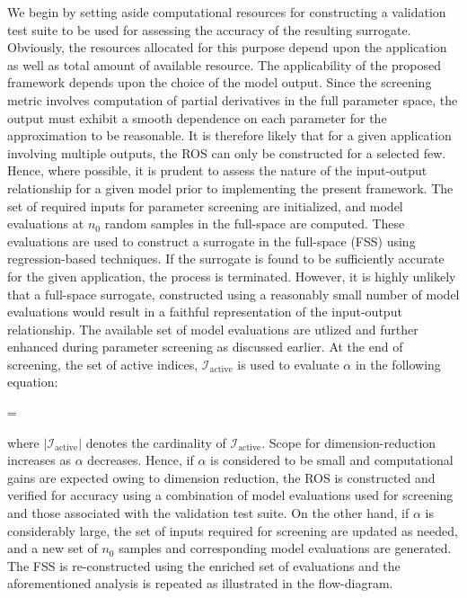 We begin by setting aside computational resources for constructing a 
validation test suite to be used for assessing the accuracy of the resulting
surrogate. Obviously, the resources allocated for this purpose
depend upon the application as well as total amount of available resource. The applicability
of the proposed framework depends upon the choice of the model output. Since the screening metric
involves computation of partial derivatives in the full parameter space, the output must exhibit
a smooth dependence on each parameter for the approximation to be reasonable. It is therefore likely
that for a given application involving multiple outputs, the ROS can only be constructed for a 
selected few. Hence, where possible, it is prudent to assess the nature of the input-output
relationship for a given model prior to implementing the present framework. The set of required inputs
for parameter screening are initialized, and model evaluations at $n_0$ random samples in the full-space
are computed. These evaluations are used to construct a surrogate in the full-space (FSS) using regression-based
techniques. If the surrogate is found to be sufficiently accurate for the given application, the process
is terminated. However, it is highly unlikely that a full-space surrogate, constructed using a reasonably 
small number of model evaluations would result in a faithful representation of the input-output relationship. 
The available set of model evaluations are utlized and further enhanced during parameter screening as
discussed earlier. At the end of screening, the set of active indices, $\mathcal{I}_\text{active}$ is used
to evaluate $\alpha$ in the following equation: 

\be
\alpha = 
\label{eq:alpha}
\ee

\noindent where $|\mathcal{I}_\text{active}|$ denotes the cardinality of $\mathcal{I}_\text{active}$.
Scope for dimension-reduction increases as $\alpha$ decreases. Hence, if $\alpha$ is
considered to be small and computational gains are expected owing to dimension reduction, the ROS
is constructed and verified for accuracy using a combination of model evaluations used for screening
and those associated with the validation test suite. On the other hand, if $\alpha$ is considerably
large, the set of inputs required for screening are updated as needed, and a new set of $n_0$ samples
and corresponding model evaluations are generated. The FSS is re-constructed using the enriched set
of evaluations and the aforementioned analysis is repeated as illustrated in the flow-diagram. 

